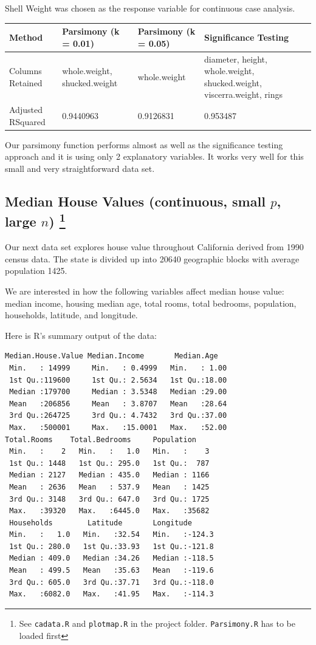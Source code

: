 \documentclass[letter]{article}
\newcounter{foot}
\begin{document}
Shell Weight was chosen as the response variable for continuous case analysis.

\begin{center}
    \begin{tabular}{ | l |  p{4cm} |  p{4cm} | p{4cm} |}
    \hline
    Method & Parsimony (k = 0.01) & Parsimony (k = 0.05) & Significance Testing \\ \hline
    	
    Columns Retained & whole.weight, shucked.weight & whole.weight & diameter, height, whole.weight, shucked.weight, viscerra.weight, rings\\ \hline
    
    Adjusted RSquared & 0.9440963 & 0.9126831 & 0.953487\\ \hline
    
    \end{tabular}
\end{center}

Our parsimony function performs almost as well as the significance testing approach and it is using only 2 explanatory variables. It works very well for this small and very straightforward data set.

\subsection*{Median House Values \cite{cadata} (continuous, small $p$, large $n$) \footnote{See \texttt{cadata.R} and \texttt{plotmap.R} in the project folder. \texttt{Parsimony.R} has to be loaded first}}
Our next data set explores house value throughout California derived from 1990 census data. The state is divided up into 20640 geographic blocks with average population 1425.

We are interested in how the following variables affect median house value: median income, housing median age, total rooms, total bedrooms, population, households, latitude, and longitude.

Here is R's summary output of the data:
\begin{verbatim}
Median.House.Value Median.Income       Median.Age   
 Min.   : 14999     Min.   : 0.4999   Min.   : 1.00  
 1st Qu.:119600     1st Qu.: 2.5634   1st Qu.:18.00  
 Median :179700     Median : 3.5348   Median :29.00  
 Mean   :206856     Mean   : 3.8707   Mean   :28.64  
 3rd Qu.:264725     3rd Qu.: 4.7432   3rd Qu.:37.00  
 Max.   :500001     Max.   :15.0001   Max.   :52.00
Total.Rooms    Total.Bedrooms     Population   
 Min.   :    2   Min.   :   1.0   Min.   :    3  
 1st Qu.: 1448   1st Qu.: 295.0   1st Qu.:  787  
 Median : 2127   Median : 435.0   Median : 1166  
 Mean   : 2636   Mean   : 537.9   Mean   : 1425  
 3rd Qu.: 3148   3rd Qu.: 647.0   3rd Qu.: 1725  
 Max.   :39320   Max.   :6445.0   Max.   :35682
 Households        Latitude       Longitude     
 Min.   :   1.0   Min.   :32.54   Min.   :-124.3  
 1st Qu.: 280.0   1st Qu.:33.93   1st Qu.:-121.8  
 Median : 409.0   Median :34.26   Median :-118.5  
 Mean   : 499.5   Mean   :35.63   Mean   :-119.6  
 3rd Qu.: 605.0   3rd Qu.:37.71   3rd Qu.:-118.0  
 Max.   :6082.0   Max.   :41.95   Max.   :-114.3  
 \end{verbatim}
\end{document}
